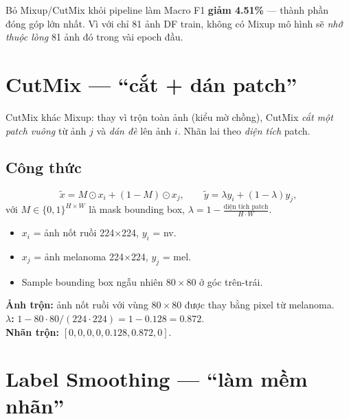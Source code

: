 \documentclass[11pt,a4paper]{article}
\begin{document}
\begin{idea}
Bỏ Mixup/CutMix khỏi pipeline làm Macro F1 \textbf{giảm 4.51\%} --- thành phần đóng góp lớn nhất. Vì với chỉ 81 ảnh DF train, không có Mixup mô hình sẽ \textit{nhớ thuộc lòng} 81 ảnh đó trong vài epoch đầu.
\end{idea}

\section{CutMix --- ``cắt + dán patch''}

\begin{simple}
CutMix khác Mixup: thay vì trộn toàn ảnh (kiểu mờ chồng), CutMix \textit{cắt một patch vuông} từ ảnh $j$ và \textit{dán đè} lên ảnh $i$. Nhãn lai theo \textit{diện tích} patch.
\end{simple}

\subsection{Công thức}

\[
  \tilde{x} = M \odot x_i + (1-M) \odot x_j, \qquad \tilde{y} = \lambda y_i + (1-\lambda) y_j,
\]
với $M \in \{0,1\}^{H\times W}$ là mask bounding box, $\lambda = 1 - \frac{\text{diện tích patch}}{H \cdot W}$.

\begin{example}
\begin{itemize}[leftmargin=*]
  \item $x_i$ = ảnh nốt ruồi 224$\times$224, $y_i$ = nv.
  \item $x_j$ = ảnh melanoma 224$\times$224, $y_j$ = mel.
  \item Sample bounding box ngẫu nhiên $80 \times 80$ ở góc trên-trái.
\end{itemize}
\textbf{Ảnh trộn:} ảnh nốt ruồi với vùng $80 \times 80$ được thay bằng pixel từ melanoma.\\
\textbf{$\lambda$:} $1 - 80 \cdot 80 / (224 \cdot 224) = 1 - 0.128 = 0.872$.\\
\textbf{Nhãn trộn:} $[0,0,0,0,\mathbf{0.128},\mathbf{0.872},0]$.
\end{example}

\section{Label Smoothing --- ``làm mềm nhãn''}
\end{document}
